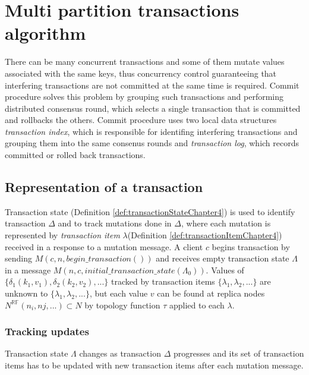 \documentclass[runningheads,a4paper]{llncs}
\newcommand{\transaction}{$\Delta$\xspace}
\newcommand{\beginTransactionMessage}{$\mathit{M}(c, n, \mathit{begin\_transaction}())$\xspace}
\newcommand{\initialTxStateMessage}{$\mathit{M}(n, c, \mathit{initial\_transaction\_state}(\Lambda_{0}))$\xspace}
\newcommand{\topology}{$\tau$\xspace}
\newcommand{\mutationsFull}{$\{\delta_{1}(k_1, v_1), \delta_{2}(k_2, v_2), ...\}$\xspace}
\newcommand{\txItem}{$\lambda$\xspace}
\newcommand{\txItems}{$\{\lambda_{1}, \lambda_{2}, ...\}$\xspace}
\newcommand{\txState}{$\Lambda$\xspace}
\newcommand{\client}{$c$\xspace}
\begin{document}
\section{Multi partition transactions algorithm}

There can be many concurrent transactions and some of them mutate values associated with the same keys, thus concurrency control guaranteeing that interfering transactions are not committed at the same time is required. Commit procedure solves this problem by grouping such transactions and performing distributed consensus round, which selects a single transaction that is committed and rollbacks the others. Commit procedure uses two local data structures \emph{transaction index}, which is responsible for identifing interfering transactions and grouping them into the same consenus rounds and \emph{transaction log}, which records committed or rolled back transactions.

\subsection{Representation of a transaction}

Transaction state (Definition \ref{def:transactionStateChapter4}) is used to identify transaction \transaction and to track mutations done in \transaction, where each mutation is represented by \emph{transaction item} \txItem (Definition \ref{def:transactionItemChapter4}) received in a response to a mutation message. A client \client begins transaction by sending \beginTransactionMessage and receives empty transaction state \txState in a message  \initialTxStateMessage. Values of \mutationsFull tracked by transaction items \txItems are unknown to \txItems, but each value $v$ can be found at replica nodes $N^{\mathbb{RF}}(n_{i},n{j},...)\subset \mathit{N}$ by topology function \topology applied to each \txItem.

\subsubsection{Tracking updates}

Transaction state \txState changes as transaction \transaction progresses and its set of transaction items has to be updated with new transaction items after each mutation message. 
\end{document}
